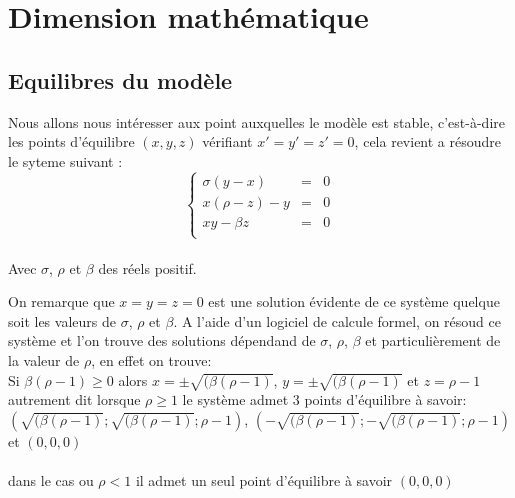 \section{Dimension mathématique}

\subsection{Equilibres du modèle}
Nous allons nous intéresser aux point auxquelles le modèle est stable, c’est-à-dire les points d’équilibre $(x,y,z)$ vérifiant $x'=y'=z'=0$, cela revient a résoudre le syteme suivant :\\
\[
    \left\{
    \begin{array}{rcl}
        \sigma(y-x)&=&0\\
        x(\rho-z)-y&=&0\\
        xy-\beta z&=&0\\
    \end{array}
    \right.
\]\\

Avec $\sigma$, $\rho$ et $\beta$ des réels positif.

On remarque que $x=y=z=0$ est une solution évidente de ce système quelque soit les valeurs de $\sigma$, $\rho$ et $\beta$.
A l'aide d'un logiciel de calcule formel, on résoud ce système et l'on trouve des solutions dépendand de $\sigma$, $\rho$, $\beta$ et particulièrement de la valeur de $\rho$, en effet on trouve:\\

Si $\beta(\rho-1)\geq 0$ alors $x= \pm \sqrt{(\beta(\rho-1)}$, $y= \pm \sqrt{(\beta(\rho-1)}$ et $z=\rho-1$\\
autrement dit lorsque $\rho\geq 1$ le système admet 3 points d'équilibre à savoir:\\
 $(\sqrt{(\beta(\rho-1)}; \sqrt{(\beta(\rho-1)}; \rho-1)$, $(-\sqrt{(\beta(\rho-1)}; -\sqrt{(\beta(\rho-1)}; \rho-1)$ et $(0,0,0)$\\\\
 dans le cas ou $\rho < 1$ il admet un seul point d'équilibre à savoir $(0,0,0)$\\
 
